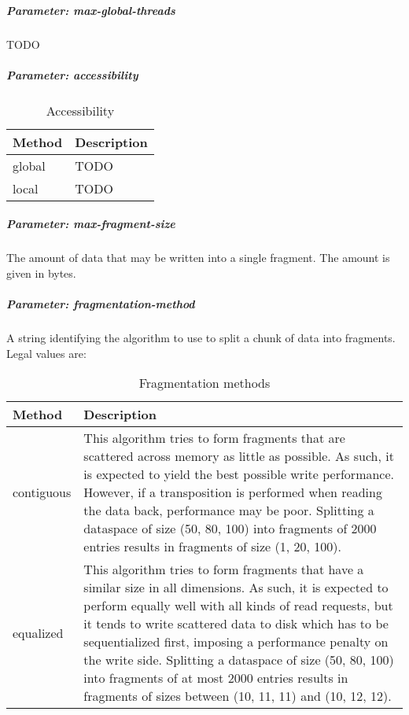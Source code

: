 \subparagraph{Parameter: max-global-threads}
TODO

\subparagraph{Parameter: accessibility}

\begin{preserve}
\begin{table}[!ht]
  \begin{center}
    \begin{tabularx}{\textwidth}{lX}
      Method & Description \\ 
      \hline
      global & TODO        \\ 
      local  & TODO        \\ 
    \end{tabularx}
  \end{center}
  \caption{Accessibility}%
  \label{tab:accessibility}
\end{table}
\end{preserve}

\subparagraph{Parameter: max-fragment-size}
The amount of data that may be written into a single fragment. 
The amount is given in bytes.

\subparagraph{Parameter: fragmentation-method}
A string identifying the algorithm to use to split a chunk of data into fragments. 
Legal values are:

\begin{preserve}
\begin{table}[!ht]
  \begin{center}
    \begin{tabularx}{\textwidth}{lX}
      Method     & Description \\
      \hline
      contiguous  & This algorithm tries to form fragments that are scattered across memory as little as possible. As such, it is expected to yield the best possible write performance. 
      However, if a transposition is performed when reading the data back, performance may be poor.
      Splitting a dataspace of size (50, 80, 100) into fragments of 2000 entries results in fragments of size (1, 20, 100). \\
      equalized   & This algorithm tries to form fragments that have a similar size in all dimensions. As such, it is expected to perform equally well with all kinds of read requests, but it tends to write scattered data to disk which has to be sequentialized first, imposing a performance penalty on the write side.
      Splitting a dataspace of size (50, 80, 100) into fragments of at most 2000 entries results in fragments of sizes between (10, 11, 11) and (10, 12, 12). \\
    \end{tabularx}
  \end{center}
  \caption{Fragmentation methods}%
  \label{tab:frag_methods}
\end{table}
\end{preserve}


